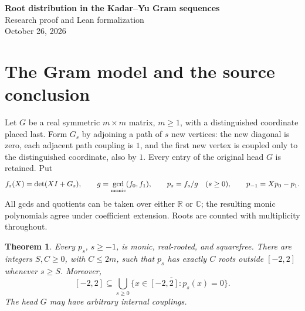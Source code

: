 \documentclass[11pt]{article}
\newtheorem{theorem}{Theorem}
\newcommand{\R}{\mathbb R}
\newcommand{\C}{\mathbb C}
\begin{document}
\begin{center}
{\Large\bfseries Root distribution in the Kadar--Yu Gram sequences}\\[.5em]
Research proof and Lean formalization\\
October 26, 2026
\end{center}
\begin{abstract}
We prove squarefreeness, eventual stabilization of the exterior root count,
and density in $[-2,2]$ for the reduced Gram-polynomial sequences appearing
in Morris--Martin Conjecture~4.5.1. The argument applies to every finite real
symmetric head with one appended free path. Removing the monic gcd of the
first two determinants gives the relevant reduced sequence. A
codimension-one eigenvalue-multiplicity bound proves squarefreeness,
including the boundary index; spectral counts give stabilization and density.
The universal Gram model and its complex coefficient and root-multiset
bridges are verified in Lean. The source application uses the mixed Gram
structure and factorization already established by Morris and Martin.
\end{abstract}

\section{The Gram model and the source conclusion}
Let $G$ be a real symmetric $m\times m$ matrix, $m\ge1$, with a distinguished
coordinate placed last. Form $G_s$ by adjoining a path of $s$ new vertices:
the new diagonal is zero, each adjacent path coupling is $1$, and the first
new vertex is coupled only to the distinguished coordinate, also by $1$.
Every entry of the original head $G$ is retained. Put
\begin{equation}\label{def}
 f_s(X)=\det(XI+G_s),\qquad
 g=\gcd_{\rm monic}(f_0,f_1),\qquad p_s=f_s/g\quad(s\ge0),
 \qquad p_{-1}=Xp_0-p_1.
\end{equation}
All gcds and quotients can be taken over either $\R$ or $\C$; the resulting
monic polynomials agree under coefficient extension. Roots are counted with
multiplicity throughout.

\begin{theorem}\label{general}
Every $p_s$, $s\ge-1$, is monic, real-rooted, and squarefree. There are
integers $S,C\ge0$, with $C\le2m$, such that $p_s$ has exactly $C$ roots
outside $[-2,2]$ whenever $s\ge S$. Moreover,
\[
 [-2,2]\subseteq
 \overline{\bigcup_{s\ge0}\{x\in[-2,2]:p_s(x)=0\}}.
\]
The head $G$ may have arbitrary internal couplings.
\end{theorem}
\end{document}
